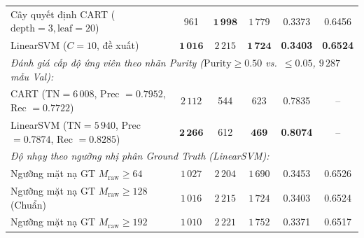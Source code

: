 \begin{table}[!t]
{\begin{tabular}{lccccc}
Cây quyết định CART ($\text{depth}=3, \text{leaf}=20$) & 961 & $\mathbf{1\,998}$ & $1\,779$ & 0.3373 & 0.6456 \\
LinearSVM ($C=10$, đề xuất) & $\mathbf{1\,016}$ & $2\,215$ & $\mathbf{1\,724}$ & \textbf{0.3403} & \textbf{0.6524} \\
\midrule
\multicolumn{6}{l}{\textit{Đánh giá cấp độ ứng viên theo nhãn Purity ($\mathrm{Purity} \ge 0.50$ vs.\ $\le 0.05$, $9\,287$ mẫu Val):}} \\
CART ($\text{TN}=6\,008$, Prec $=0.7952$, Rec $=0.7722$) & $2\,112$ & 544 & 623 & 0.7835 & -- \\
LinearSVM ($\text{TN}=5\,940$, Prec $=0.7874$, Rec $=0.8285$) & $\mathbf{2\,266}$ & 612 & $\mathbf{469}$ & \textbf{0.8074} & -- \\
\midrule
\multicolumn{6}{l}{\textit{Độ nhạy theo ngưỡng nhị phân Ground Truth (LinearSVM):}} \\
Ngưỡng mặt nạ GT $M_{\text{raw}} \ge 64$ & $1\,027$ & $2\,204$ & $1\,690$ & 0.3453 & 0.6526 \\
Ngưỡng mặt nạ GT $M_{\text{raw}} \ge 128$ (Chuẩn) & $1\,016$ & $2\,215$ & $1\,724$ & 0.3403 & 0.6524 \\
Ngưỡng mặt nạ GT $M_{\text{raw}} \ge 192$ & $1\,010$ & $2\,221$ & $1\,752$ & 0.3371 & 0.6517 \\
\bottomrule
\end{tabular}%
}
\end{table}

